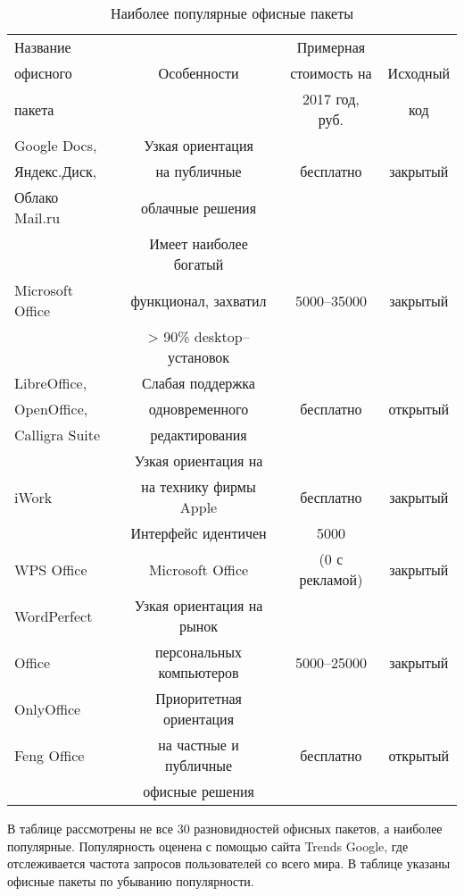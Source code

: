 \begin{table}[!h]
 \begin{tabular}{|l|c|c|c|}
\hline
Название  &   & Примерная  &  \\
офисного  & Особенности &  стоимость на  & Исходный\\
пакета & & 2017 год, руб. &  код  \\
\hline
Google Docs, & Узкая ориентация & &\\
Яндекс.Диск, & на публичные &  бесплатно & закрытый \\
Облако Mail.ru  & облачные решения & & \\
\hline
 &  Имеет наиболее богатый &  &  \\
 Microsoft Office &  функционал, захватил  &  5000--35000&  закрытый\\
 & > 90\% desktop--установок  & & \\
\hline
LibreOffice,& Слабая поддержка & & \\
OpenOffice, & одновременного &  бесплатно & открытый \\
Calligra Suite & редактирования & & \\
\hline
 & Узкая ориентация на & & \\
iWork & на технику фирмы Apple &  бесплатно & закрытый \\
\hline
 & Интерфейс идентичен & 5000 & \\
WPS Office & Microsoft Office &  (0 с рекламой) & закрытый \\
\hline
WordPerfect & Узкая ориентация на рынок&  & \\
Office &  персональных компьютеров & 5000--25000 & закрытый \\

\hline
OnlyOffice & Приоритетная ориентация  & & \\
Feng Office & на частные и публичные &  бесплатно & открытый \\
  & офисные решения & & \\
\hline
 \end{tabular}
\caption{Наиболее популярные офисные пакеты}
\end{table}
В таблице рассмотрены не все 30 разновидностей офисных пакетов, а наиболее популярные. Популярность оценена  с помощью  сайта Trends Google, где отслеживается частота запросов пользователей со всего мира.
В таблице указаны офисные пакеты по убыванию популярности.
